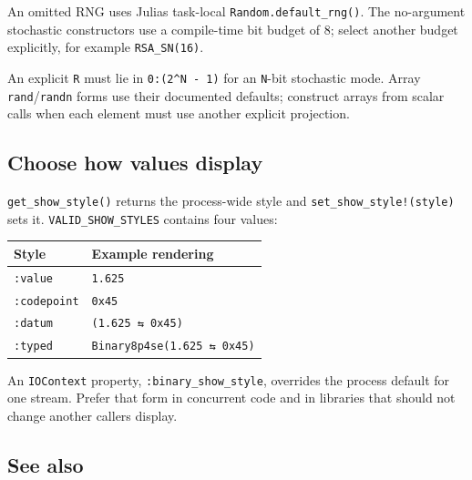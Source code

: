 An omitted RNG uses Julia{\textquotesingle}s task-local \texttt{Random.default\_\allowbreak{}rng()}. The no-argument stochastic constructors use a compile-time bit budget of 8; select another budget explicitly, for example \texttt{RSA\_\allowbreak{}SN(16)}.



An explicit \texttt{R} must lie in \texttt{0:(2{\textasciicircum}N - 1)} for an \texttt{N}-bit stochastic mode. Array \texttt{rand}/\allowbreak\texttt{randn} forms use their documented defaults; construct arrays from scalar calls when each element must use another explicit projection.



\subsection{Choose how values display}



\label{17256249780714336870}{}


\texttt{get\_\allowbreak{}show\_\allowbreak{}style()} returns the process-wide style and \texttt{set\_\allowbreak{}show\_\allowbreak{}style!(style)} sets it. \texttt{VALID\_\allowbreak{}SHOW\_\allowbreak{}STYLES} contains four values:




\begin{table}[h]
\centering
\begin{tabulary}{\linewidth}{L L}
\toprule
Style & Example rendering \\
\toprule
\texttt{:value} & \texttt{1.625} \\
\texttt{:codepoint} & \texttt{0x45} \\
\texttt{:datum} & \texttt{(1.625 ⇆ 0x45)} \\
\texttt{:typed} & \texttt{Binary8p4se(\allowbreak{}1.625 ⇆ 0x45)} \\
\bottomrule
\end{tabulary}

\end{table}



An \texttt{IOContext} property, \texttt{:binary\_\allowbreak{}show\_\allowbreak{}style}, overrides the process default for one stream. Prefer that form in concurrent code and in libraries that should not change another caller{\textquotesingle}s display.



\subsection{See also}



